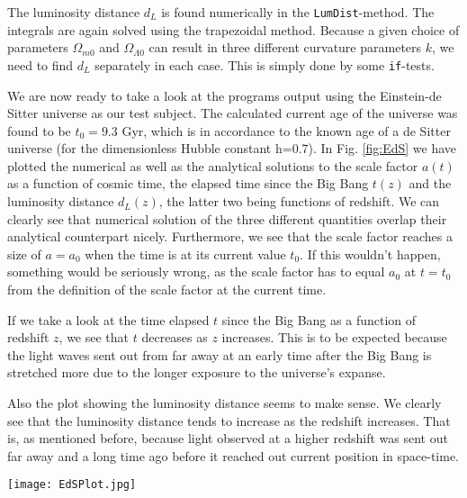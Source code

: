 \documentclass{emulateapj}
\begin{document}
	 The luminosity distance $d_L$ is found numerically in the \texttt{LumDist}-method. The integrals are again solved using the trapezoidal method. Because a given choice of parameters $\Omega_{m 0}$ and $\Omega_{\Lambda 0}$ can result in three different curvature parameters $k$, we need to find $d_L$ separately in each case. This is simply done by some \texttt{if}-tests. 
	 
	 We are now ready to take a look at the programs output using the Einstein-de Sitter universe as our test subject. The calculated current age of the universe was found to be $t_0= 9.3$ Gyr, which is in accordance to the known age of a de Sitter universe (for the dimensionless Hubble constant h=0.7). In Fig. \ref{fig:EdS} we have plotted the numerical as well as the analytical solutions to the scale factor $a(t)$ as a function of cosmic time, the elapsed time since the Big Bang $t(z)$ and the luminosity distance $d_L(z)$, the latter two being functions of redshift. We can clearly see that numerical solution of the three different quantities overlap their analytical counterpart nicely. Furthermore, we see that the scale factor reaches a size of $a=a_0$ when the time is at its current value $t_0$. If this wouldn't happen, something would be seriously wrong, as the scale factor has to equal $a_0$ at $t=t_0$ from the definition of the scale factor at the current time.
	 
	 If we take a look at the time elapsed $t$ since the Big Bang as a function of redshift $z$, we see that $t$ decreases as $z$ increases. This is to be expected because the light waves sent out from far away at an early time after the Big Bang is stretched more due to the longer exposure to the universe's expanse. 
	 
	 Also the plot showing the luminosity distance seems to make sense. We clearly see that the luminosity distance tends to increase as the redshift increases. That is, as mentioned before, because light observed at a higher redshift was sent out far away and a long time ago before it reached out current position in space-time.
	 
	 \begin{figure*}
	 	\texttt{[image: EdSPlot.jpg]}
	 	\caption{The figure shows the program output for Exercise 4.ii) using an Einstein-de Sitter solution as a test subject. The leftmost plot shows the scale factor $a/a_0$ as a function of the cosmic time $t/t_0$. In the middle the time elapsed $t/t_0$ since the Big Bang as a function of redshift $z$. The rightmost plot shows the luminosity distance $d_L$ as a function of redshift $z$.}
	 	\label{fig:EdS}
	 \end{figure*}
	  
\end{document}
